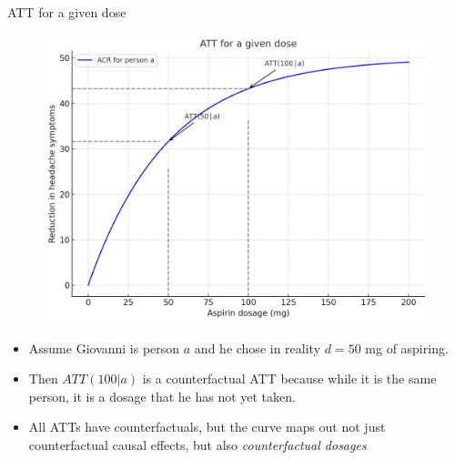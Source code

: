 \documentclass{beamer}
\begin{document}
\begin{frame}{ATT for a given dose}

\begin{figure}
\begin{center}
             \includegraphics[scale=0.3]{./lecture_includes/acrt_fig1.png}
\end{center}
\end{figure}

\begin{itemize}
\item Assume Giovanni is person $a$ and he chose in reality $d=50$ mg of aspiring.  
\item Then $ATT(100|a)$ is a counterfactual ATT because while it is the same person, it is a dosage that he has not yet taken.  
\item All ATTs have counterfactuals, but the curve maps out not just counterfactual causal effects, but also \emph{counterfactual dosages}
\end{itemize}


\end{frame}
\end{document}
